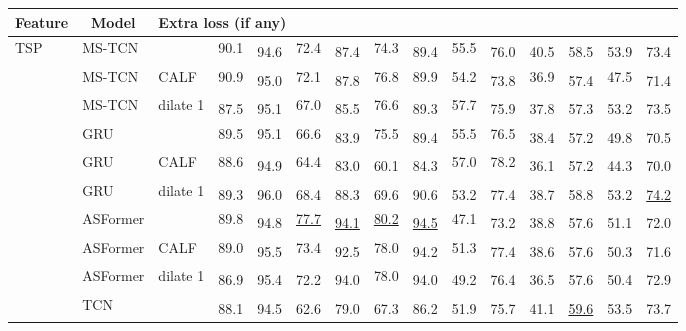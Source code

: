 \documentclass[runningheads]{llncs}
\newcommand{\best}[1]{\underline{#1}}
\newcommand{\nms}{\textsuperscript{\textdagger}}
\begin{document}
\begin{table*}[p]
{\begin{tabularx}{\textwidth}{lll
        rr
        rr
        rr
        rr
        rr
        rr
    }
        \midrule
        \multicolumn{1}{c}{Feature} & \multicolumn{1}{c}{Model} &
            \multicolumn{4}{l}{Extra loss (if any)} \\
        \midrule
        TSP~\cite{tsp}
        & MS-TCN &
            & 90.1 & \nms 94.6 & 72.4 & \nms 87.4 & 74.3 & \nms 89.4 & 55.5 & \nms 76.0 & \nms 40.5 & \nms 58.5 & \nms 53.9 & \nms 73.4 \\

        & MS-TCN & CALF
            & 90.9 & \nms 95.0 & 72.1 & \nms 87.8 & 76.8 & 89.9 & 54.2 & \nms 73.8 & 36.9 & \nms 57.4 & 47.5 & \nms 71.4 \\

        & MS-TCN & dilate 1
            & \nms 87.5 & \nms 95.1 & 67.0 & \nms 85.5 & 76.6 & \nms 89.3 & 57.7 & \nms 75.9 & \nms 37.8 & \nms 57.3 & \nms 53.2 & \nms 73.5 \\

        \cmidrule{2-15}
        & GRU &
            & 89.5 & 95.1 & 66.6 & \nms 83.9 & 75.5 & \nms 89.4 & 55.5 & 76.5 & \nms 38.4 & \nms 57.2 & \nms 49.8 & \nms 70.5 \\

        & GRU & CALF
            & 88.6 & \nms 94.9 & 64.4 & \nms 83.0 & \nms 60.1 & \nms 84.3 & 57.0 & 78.2 & \nms 36.1 & \nms 57.2 & \nms 44.3 & \nms 70.0 \\

        & GRU & dilate 1
            & \nms 89.3 & \nms 96.0 & \nms 68.4 & \nms 88.3 & \nms 69.6 & \nms 90.6 & \nms 53.2 & \nms 77.4 & \nms 38.7 & \nms 58.8 & \nms 53.2 & \nms \best{74.2} \\

        \cmidrule{2-15}
        & ASFormer &
            & 89.8 & \nms 94.8 & \best{77.7} & \nms \best{94.1} & \best{80.2} & \nms \best{94.5} & 47.1 & \nms 73.2 & \nms 38.8 & \nms 57.6 & \nms 51.1 & \nms 72.0 \\
        & ASFormer & CALF
            & 89.0 & \nms 95.5 & 73.4 & \nms 92.5 & 78.0 & \nms 94.2 & 51.3 & \nms 77.4 & \nms 38.6 & \nms 57.6 & \nms 50.3 & \nms 71.6 \\
        & ASFormer & dilate 1
            & \nms 86.9 & \nms 95.4 & \nms 72.2 & \nms 94.0 & 78.0 & \nms 94.0 & \nms 49.2 & \nms 76.4 & \nms 36.5 & \nms 57.6 & \nms 50.4 & \nms 72.9 \\

        \cmidrule{2-15}
        & TCN &
            & \nms 88.1 & \nms 94.5 & \nms 62.6 & \nms 79.0 & \nms 67.3 & \nms 86.2 & \nms 51.9 & \nms 75.7 & \nms 41.1 & \nms \best{59.6} & \nms 53.5 & \nms 73.7 \\


\end{tabularx}}
\end{table*}
\end{document}
